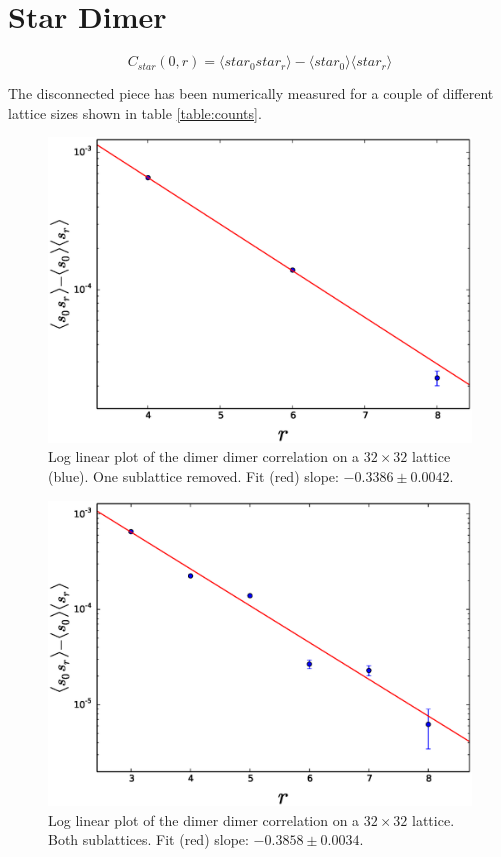 \documentclass[aps,floatfix,11pt]{revtex4-1}
\begin{document}
\section{Star Dimer}

\begin{equation}
    \label{}
    C_{star}(0,r) =  \langle star_0 star_r \rangle -\langle star_0 \rangle \langle star_r \rangle
\end{equation}

\noindent
The disconnected piece has been numerically measured for a couple of different lattice sizes shown
in table \ref{table:counts}.

\begin{figure}[h]
    \centering
    \includegraphics[width=8.5 cm]{s_dimer_dimer_cor_loglin_one_sublat_32x32}
    \caption{Log linear plot of the dimer dimer correlation on a $32\times32$ lattice (blue). 
        One sublattice removed. Fit (red) slope: $-0.3386 \pm 0.0042$. 
    \label{fig:s_dimer_dimer_log}}
\end{figure}

\begin{figure}[h]
    \centering
    \includegraphics[width=8.5 cm]{s_dimer_dimer_cor_loglin_both_sublat_32x32}
    \caption{Log linear plot of the dimer dimer correlation on a $32\times32$ lattice. 
        Both sublattices. Fit (red) slope: $ -0.3858 \pm 0.0034$.
    \label{fig:s_dimer_dimer_log}}
\end{figure}
\end{document}

